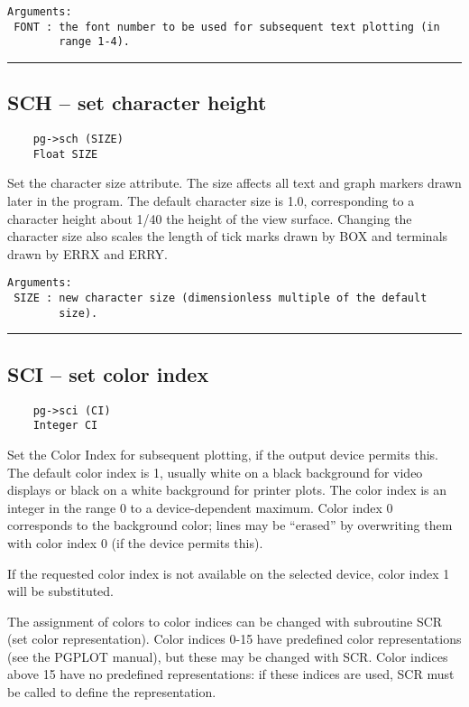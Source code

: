 \begin{verbatim}
Arguments:
 FONT : the font number to be used for subsequent text plotting (in
        range 1-4). 
\end{verbatim}

\hrule

\subsection*{SCH -- set character height }

\begin{verbatim}
    pg->sch (SIZE)
    Float SIZE
\end{verbatim}

Set the character size attribute.  The size affects all text and graph
markers drawn later in the program.  The default character size is
1.0, corresponding to a character height about 1/40 the height of the
view surface.  Changing the character size also scales the length of
tick marks drawn by BOX and terminals drawn by ERRX and ERRY.

\begin{verbatim}
Arguments:
 SIZE : new character size (dimensionless multiple of the default
        size). 
\end{verbatim}

\hrule

\subsection*{SCI -- set color index }

\begin{verbatim}
    pg->sci (CI)
    Integer CI
\end{verbatim}

Set the Color Index for subsequent plotting, if the output device
permits this.  The default color index is 1, usually white on a black
background for video displays or black on a white background for
printer plots.  The color index is an integer in the range 0 to a
device-dependent maximum.  Color index 0 corresponds to the background
color; lines may be ``erased'' by overwriting them with color index 0
(if the device permits this).

If the requested color index is not available on the selected device,
color index 1 will be substituted.

The assignment of colors to color indices can be changed with
subroutine SCR (set color representation).  Color indices 0-15 have
predefined color representations (see the PGPLOT manual), but these
may be changed with SCR.  Color indices above 15 have no predefined
representations: if these indices are used, SCR must be called to
define the representation.

